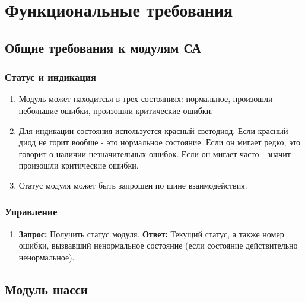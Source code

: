 \documentclass[utf8]{report}
\begin{document}
\chapter{Функциональные требования}

\section{Общие требования к модулям СА}

\subsection{Статус и индикация}

\begin{enumerate}
  \item Модуль может находитсья в трех состояниях: нормальное, произошли небольшие ошибки, произошли критические ошибки.
  \item Для индикации состояния используется красный светодиод. Если красный диод не горит вообще - это нормальное состояние. Если он мигает редко, это говорит о наличии незначительных ошибок. Если он мигает часто - значит произошли критические ошибки.
  \item Статус модуля может быть запрошен по шине взаимодействия.
\end{enumerate}

\subsection{Управление}

\begin{enumerate}
  \item \textbf{Запрос:} Получить статус модуля. \textbf{Ответ:} Текущий статус, а также номер ошибки, вызвавший ненормальное состояние (если состояние действительно ненормальное).
\end{enumerate}

\section{Модуль шасси}
\end{document}
